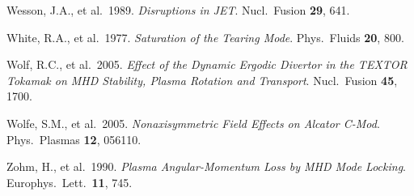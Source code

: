 \documentclass[notitlepage,12pt]{article}
\begin{document}
\begin{description}
\item Wesson, J.A., et al.\ 1989. {\em Disruptions in JET}. Nucl.\ Fusion {\bf 29}, 641. 
\item White, R.A., et al.\ 1977. {\em Saturation of the Tearing Mode}. Phys.\ Fluids {\bf 20}, 800.
\item Wolf, R.C., et al.\ 2005. {\em Effect of the Dynamic Ergodic Divertor in the TEXTOR Tokamak on MHD Stability, Plasma Rotation and Transport}. Nucl.\ Fusion {\bf 45}, 1700. 
\item Wolfe, S.M., et al.\ 2005. {\em Nonaxisymmetric Field Effects on Alcator C-Mod}. Phys.\ Plasmas {\bf 12}, 056110. 
\item Zohm, H., et al.\ 1990. {\em Plasma Angular-Momentum Loss by MHD Mode Locking}. Europhys.\ Lett.\ {\bf 11}, 745.
\end{description}
\end{document}
